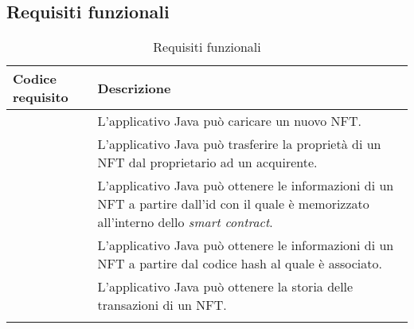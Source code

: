 \subsection{Requisiti funzionali}
\begin{longtabu}{|X[0.8,c]|X[3,c]|}
  \hline 

  \textbf{Codice requisito} & \textbf{Descrizione} \\ 

  \hline

   \label{rfun:upload-new-nft} & L'applicativo Java può caricare un nuovo NFT. \\
  
  \hline

   \label{rfun:transfer-nft} & L'applicativo Java può trasferire la proprietà di un NFT dal proprietario ad un acquirente. \\ 
  
  \hline

   \label{rfun:get-nft-by-id} & L'applicativo Java può ottenere le informazioni di un NFT a partire dall'id con il quale è memorizzato all'interno dello \textit{smart contract}. \\ 
  
  \hline

   \label{rfun:get-nft-by-hash} & L'applicativo Java può ottenere le informazioni di un NFT a partire dal codice hash al quale è associato. \\ 
  
  \hline

   \label{rfun:get-transaction-history} & L'applicativo Java può ottenere la storia delle transazioni di un NFT. \\ 
  
  \hline

  \caption{Requisiti funzionali}
\end{longtabu}

